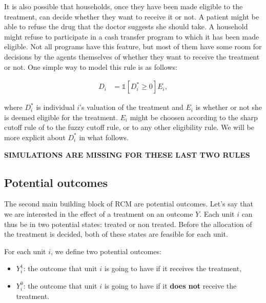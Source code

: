 \documentclass[]{book}
\providecommand{\tightlist}{%
  \setlength{\itemsep}{0pt}\setlength{\parskip}{0pt}}
\newcommand{\uns}[1]{\mathds{1}[ #1 ]}
\theoremstyle{definition}
\theoremstyle{definition}
\theoremstyle{definition}
\theoremstyle{remark}
\let\BeginKnitrBlock\begin \let\EndKnitrBlock\end
\begin{document}
It is also possible that households, once they have been made eligible to the treatment, can decide whether they want to receive it or not.
A patient might be able to refuse the drug that the doctor suggests she should take.
A household might refuse to participate in a cash transfer program to which it has been made eligible.
Not all programs have this feature, but most of them have some room for decisions by the agents themselves of whether they want to receive the treatment or not.
One simple way to model this rule is as follows:

\begin{align}\label{eq:eligself}
  D_i & = \uns{D^*_i\geq0}E_i,
\end{align}

where \(D^*_i\) is individual \(i\)'s valuation of the treatment and \(E_i\) is whether or not she is deemed eligible for the treatment.
\(E_i\) might be choosen according to the sharp cutoff rule of to the fuzzy cutoff rule, or to any other eligibility rule.
We will be more explicit about \(D_i^*\) in what follows.

\textbf{SIMULATIONS ARE MISSING FOR THESE LAST TWO RULES}

\hypertarget{potential-outcomes}{%
\subsection{Potential outcomes}\label{potential-outcomes}}

The second main building block of RCM are potential outcomes.
Let's say that we are interested in the effect of a treatment on an outcome \(Y\).
Each unit \(i\) can thus be in two potential states: treated or non treated.
Before the allocation of the treatment is decided, both of these states are feasible for each unit.

\BeginKnitrBlock{definition}[Potential outcomes]
\protect\hypertarget{def:unnamed-chunk-2}{}{\label{def:unnamed-chunk-2} \iffalse (Potential outcomes) \fi{} }For each unit \(i\), we define two potential outcomes:
\EndKnitrBlock{definition}

\begin{itemize}
\tightlist
\item
  \(Y_i^1\): the outcome that unit \(i\) is going to have if it receives the treatment,
\item
  \(Y_i^0\): the outcome that unit \(i\) is going to have if it \textbf{does not} receive the treatment.
\end{itemize}
\end{document}
